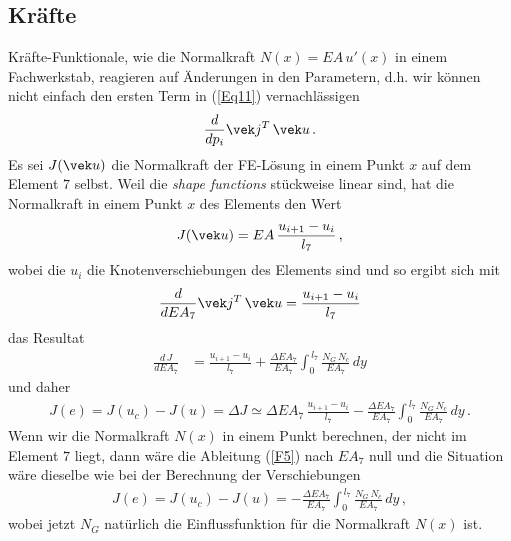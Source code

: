 {{{{{\textcolor{blau2}{\subsection{Kr\"{a}fte}}
Kr\"{a}fte-Funktionale, wie die Normalkraft $N(x) = EA\,u'(x)$ in einem Fachwerkstab, reagieren auf \"{A}nderungen in den Parametern, d.h. wir k\"{o}nnen nicht einfach den ersten Term in (\ref{Eq11}) vernachl\"{a}ssigen
\begin{align} \label{F5}
\frac{d}{d p_i} \vek j^T\,\vek u\,.
\end{align}
Es sei $J(\vek u)$ die Normalkraft der FE-L\"{o}sung in einem Punkt $x$ auf dem Element $7$ selbst. Weil die {\em shape functions\/} st\"{u}ckweise linear sind, hat die Normalkraft in einem Punkt  $x$ des Elements den Wert
\begin{align}
J(\vek u) = EA\,\frac{u_{i+1} - u_i}{l_7}\,,
\end{align}
wobei die $u_i$ die Knotenverschiebungen des Elements sind und so ergibt sich mit
\begin{align}
\frac{d}{d EA_7} \vek j^T\,\vek u = \frac{u_{i+1} - u_i}{l_7}
\end{align}
das Resultat
\begin{align}
\frac{d\,J}{d EA_7} &= \frac{u_{i+1} - u_i}{l_7} + \frac{\Delta EA_7}{EA_7}\int_0^{\,l_7} \frac{N_G \,N_c}{EA_7}\,dy
\end{align}
und daher
\begin{align}
J(e) = J(u_c) - J(u) = \Delta J \simeq  \Delta EA_7\,\frac{u_{i+1} - u_i}{l_7} -\frac{\Delta EA_7}{EA_7}\int_0^{\,l_7}\frac{N_G \,N_c}{EA_7}\,dy\,.
\end{align}
Wenn wir die Normalkraft $N(x)$ in einem Punkt berechnen, der nicht im Element $7$ liegt, dann w\"{a}re die Ableitung (\ref{F5}) nach $EA_7$ null und die Situation w\"{a}re dieselbe wie bei der Berechnung der Verschiebungen
\begin{align}
J(e) = J(u_c) - J(u) = -\frac{\Delta EA_7}{EA_7}\int_0^{\,l_7}\frac{N_G \,N_c}{EA_7}\,dy\,,
\end{align}
wobei jetzt $N_G$ nat\"{u}rlich die Einflussfunktion f\"{u}r die Normalkraft $N(x)$ ist.\\


}}}}}
